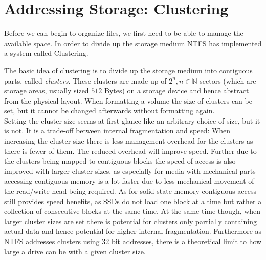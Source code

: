 \section{Addressing Storage: Clustering}
\label{sec:Cluster}
Before we can begin to organize files, we first need to be able to manage the available space. In order to divide up the storage medium NTFS has implemented a system called Clustering.

The basic idea of clustering is to divide up the storage medium into contiguous parts, called \textit{clusters}. These clusters are made up of $2^n, n \in \mathbb{N}$\cite{microsoftinc:2018:DCS} sectors (which are storage areas, usually sized $512$ Bytes) on a storage device and hence abstract from the physical layout. When formatting a volume the size of clusters can be set, but it cannot be changed afterwards without formatting again.\cite{RUSSINOVICH_ET_AL:2012:WI}\\
Setting the cluster size seems at first glance like an arbitrary choice of size, but it is not. It is a trade-off between internal fragmentation and speed:
When increasing the cluster size there is less management overhead for the clusters as there is fewer of them. The reduced overhead will improve speed.\cite{RUSSINOVICH_ET_AL:2012:WI} Further due to the clusters being mapped to contiguous blocks the speed of access is also improved with larger cluster sizes, as especially for media with mechanical parts accessing contiguous memory is a lot faster due to less mechanical movement of the read/write head being required. As for solid state memory contiguous access still provides speed benefits, as SSDs do not load one block at a time but rather a collection of consecutive blocks at the same time.\cite{BELLOSA:2017:OS}
At the same time though, when larger cluster sizes are set there is potential for clusters only partially containing actual data and hence potential for higher internal fragmentation. Furthermore as NTFS addresses clusters using 32 bit addresses, there is a theoretical limit to how large a drive can be with a given cluster size.\cite{hughes:2010:UT2}


